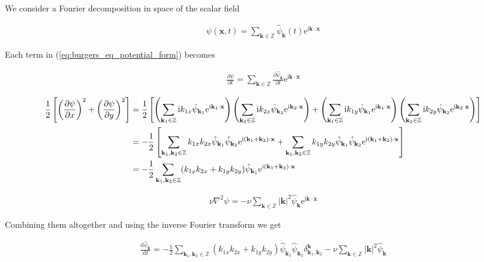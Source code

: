 \documentclass[9pt]{article}
\newcommand{\pder}[2]{\frac{\partial #1}{\partial #2}}               %
\newcommand{\psihat}[1]{\hat{\psi}_{#1}}      				          %
\newcommand{\ii}{\mathrm{i}}      								  %
\newcommand{\e}{\mathrm{e}}      								  %
\newcommand{\bfx}{\mathbf{x}}								%
\newcommand{\bfk}{\mathbf{k}}								%
\newcommand{\bfkn}[1]{\mathbf{k}_{#1}}								%
\begin{document}
We consider a Fourier decomposition in space of the scalar field 

\begin{align}
	\psi(\bfx, t) = \sum_{\bfk \in \mathbb{Z}} \psihat{\bfk}(t)\e^{\ii \bfk \cdot \bfx}
	\label{eq:fourier_decomp}
\end{align}

Each term in (\ref{eq:burgers_eq_potential_form}) becomes

\begin{align}
	\pder{\psi}{t} = \sum_{\bfk \in \mathbb{Z}} \pder{\psihat{\bfk}}{t} \e^{\ii \bfk \cdot \bfx}
\end{align}

\begin{align}
\frac{1}{2}\left[\left(\pder{\psi}{x}\right)^2 + \left(\pder{\psi}{y}\right)^2\right] &= \frac{1}{2} \left[ \left(\sum_{\bfkn{1} \in \mathbb{Z}}\ii k_{1x}\psihat{\bfkn{1}} \e^{\ii \bfkn{1} \cdot \bfx}\right)\left(\sum_{\bfkn{2} \in \mathbb{Z}}\ii k_{2x}\psihat{\bfkn{2}} \e^{\ii \bfkn{2} \cdot \bfx}\right) + \left(\sum_{\bfkn{1} \in \mathbb{Z}}\ii k_{1y}\psihat{\bfkn{1}} \e^{\ii \bfkn{1} \cdot \bfx}\right)\left(\sum_{\bfkn{2} \in \mathbb{Z}}\ii k_{2y}\psihat{\bfkn{2}} \e^{\ii \bfkn{2} \cdot \bfx}\right) \right] \notag \\ 
&= -\frac{1}{2}\left[\sum_{\bfkn{1}, \bfkn{2} \in \mathbb{Z}}k_{1x}k_{2x}\psihat{\bfkn{1}} \psihat{\bfkn{2}}\e^{\ii (\bfkn{1} + \bfkn{2}) \cdot \bfx}+\sum_{\bfkn{1}, \bfkn{2} \in \mathbb{Z}}k_{1y}k_{2y}\psihat{\bfkn{1}} \psihat{\bfkn{2}}\e^{\ii (\bfkn{1} + \bfkn{2}) \cdot \bfx} \right] \notag \\
&= -\frac{1}{2}\sum_{\bfkn{1}, \bfkn{2} \in \mathbb{Z}}(k_{1x}k_{2x} + k_{1y}k_{2y})\psihat{\bfkn{1}} \e^{\ii (\bfkn{1}+ \bfkn{2}) \cdot \bfx}
\end{align}

\begin{align}
\nu \nabla^2 \psi = -\nu\sum_{\bfk \in \mathbb{Z}} |\bfk|^2\psihat{\bfk} \e^{\ii \bfk \cdot \bfx}
\end{align}

Combining them altogether and using the inverse Fourier transform we get

\begin{align}
	\frac{\mathrm{d} \psihat{\bfk}}{\mathrm{d}t} = - \frac{1}{2} \sum_{\bfkn{1}, \bfkn{2} \in \mathbb{Z}}(k_{1x}k_{2x} + k_{1y}k_{2y})\psihat{\bfkn{1}} \psihat{\bfkn{2}} \delta_{\bfkn{1}, \bfkn{2}}^{\bfk} - \nu \sum_{\bfk \in \mathbb{Z}} |\bfk|^2\psihat{\bfk}
	\label{eq:burgers_eq_pot_fourier_space}
\end{align}
\end{document}
